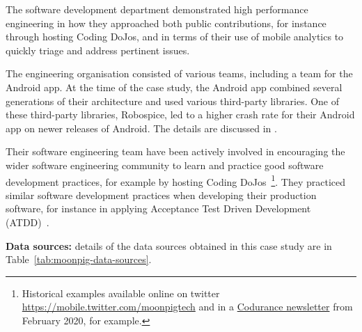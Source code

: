 The software development department demonstrated high performance engineering in how they approached both public contributions, for instance through hosting Coding DoJos, and in terms of their use of mobile analytics to quickly triage and address pertinent issues.

The engineering organisation consisted of various teams, including a team for the Android app. At the time of the case study, the Android app combined several generations of their architecture and used various third-party libraries. One of these third-party libraries, Robospice, led to a higher crash rate for their Android app on newer releases of Android. The details are discussed in .

Their software engineering team have been actively involved in encouraging the wider software engineering community to learn and practice good software development practices, for example by hosting Coding DoJos~\footnote{Historical examples available online on twitter \url{https://mobile.twitter.com/moonpigtech} and in a \href{https://www.codurance.com/publications/newsletters/2020-02-13-newsletter}{Codurance newsletter} from February 2020, for example.}. They practiced similar software development practices when developing their production software, for instance in applying Acceptance Test Driven Development (ATDD)~.

\textbf{Data sources:}  details of the data sources obtained in this case study are in Table~\ref{tab:moonpig-data-sources}.

